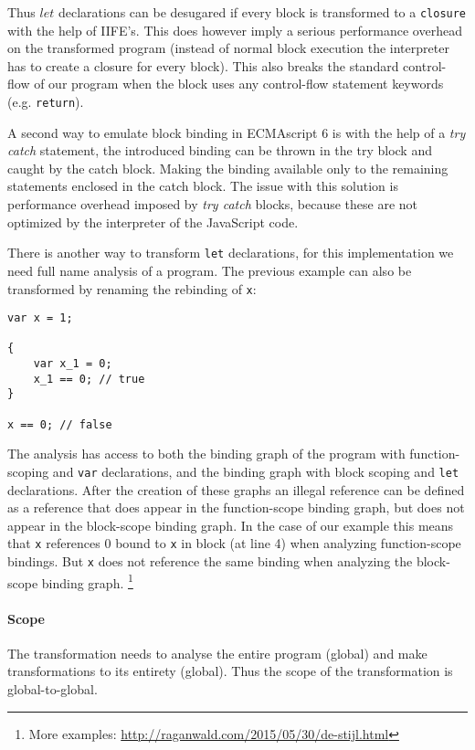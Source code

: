 Thus $let$ declarations can be desugared if every block is transformed to a \lstinline$closure$ with the help of IIFE's. This does however imply a serious performance overhead on the transformed program (instead of normal block execution the interpreter has to create a closure for every block). This also breaks the standard control-flow of our program when the block uses any control-flow statement keywords (e.g. \lstinline$return$).

A second way to emulate block binding in ECMAscript 6 is with the help of a \textit{try catch} statement, the introduced binding can be thrown in the try block and caught by the catch block. Making the binding available only to the remaining statements enclosed in the catch block. The issue with this solution is performance overhead imposed by \textit{try catch} blocks, because these are not optimized by the interpreter of the JavaScript code.

There is another way to transform \lstinline$let$ declarations, for this implementation we need full name analysis of a program. The previous example can also be transformed by renaming the rebinding of \lstinline$x$:

\begin{lstlisting}
var x = 1;

{
	var x_1 = 0;
	x_1 == 0; // true
}

x == 0; // false
\end{lstlisting}

The analysis has access to both the binding graph of the program with function-scoping and \lstinline$var$ declarations, and the binding graph with block scoping and \lstinline$let$ declarations. After the creation of these graphs an illegal reference can be defined as a reference that does appear in the function-scope binding graph, but does not appear in the block-scope binding graph. In the case of our example this means that \lstinline$x$ references 0 bound to \lstinline$x$ in block (at line 4) when analyzing function-scope bindings. But \lstinline$x$ does not reference the same binding when analyzing the block-scope binding graph. \footnote{More examples: \url{http://raganwald.com/2015/05/30/de-stijl.html}}

\paragraph{Scope}
The transformation needs to analyse the entire program (global) and make transformations to its entirety (global). Thus the scope of the transformation is global-to-global.

